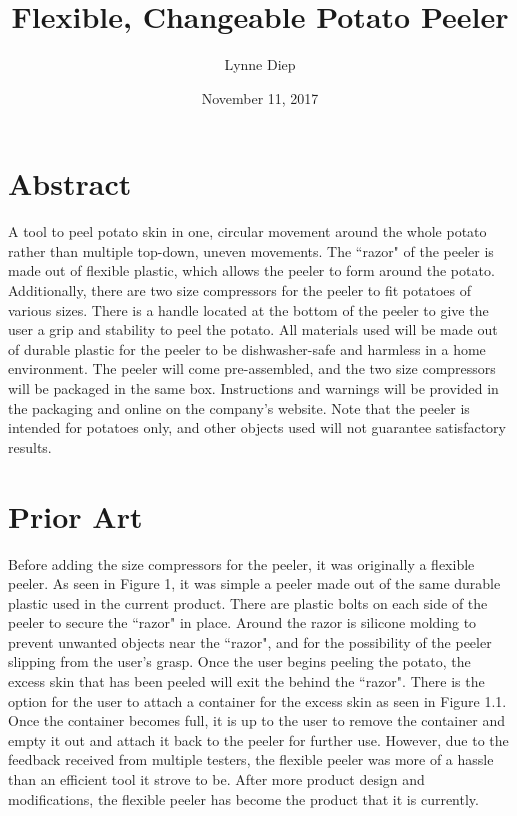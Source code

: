 \documentclass[twocolumn]{article}
\title{Flexible, Changeable Potato Peeler}
\author{Lynne Diep}
\date{November 11, 2017}
\begin{document}
\maketitle

\section*{Abstract}
A tool to peel potato skin in one, circular movement around the whole potato rather than multiple top-down, uneven movements. The ``razor" of the peeler is made out of flexible plastic, which allows the peeler to form around the potato. Additionally, there are two size compressors for the peeler to fit potatoes of various sizes. There is a handle located at the bottom of the peeler to give the user a grip and stability to peel the potato. All materials used will be made out of durable plastic for the peeler to be dishwasher-safe and harmless in a home environment. The peeler will come pre-assembled, and the two size compressors will be packaged in the same box. Instructions and warnings will be provided in the packaging and online on the company's website. Note that the peeler is intended for potatoes only, and other objects used will not guarantee satisfactory results.
\section*{Prior Art}
Before adding the size compressors for the peeler, it was originally a flexible peeler. As seen in Figure 1, it was simple a peeler made out of the same durable plastic used in the current product. There are plastic bolts on each side of the peeler to secure the ``razor" in place. Around the razor is silicone molding to prevent unwanted objects near the ``razor", and for the possibility of the peeler slipping from the user's grasp. Once the user begins peeling the potato, the excess skin that has been peeled will exit the behind the ``razor". There is the option for the user to attach a container for the excess skin as seen in Figure 1.1. Once the container becomes full, it is up to the user to remove the container and empty it out and attach it back to the peeler for further use. However, due to the feedback received from multiple testers, the flexible peeler was more of a hassle than an efficient tool it strove to be. After more product design and modifications, the flexible peeler has become the product that it is currently.
\end{document}
